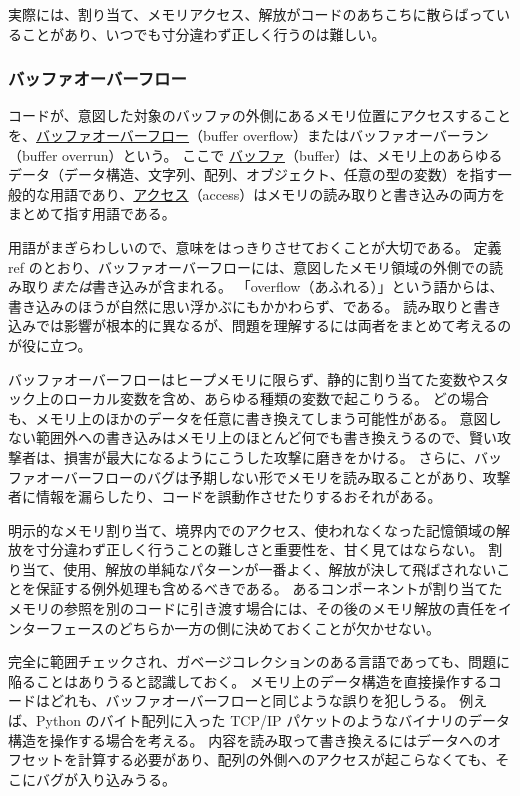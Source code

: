 \documentclass[uplatex]{jsarticle}
\def\ref#1{ref}%
\def\label#1{}%
\begin{document}
実際には、割り当て、メモリアクセス、解放がコードのあちこちに散らばっていることがあり、いつでも寸分違わず正しく行うのは難しい。

\subsubsection{バッファオーバーフロー}\label{subsec:ch9-buffer-overflow}

\begin{dfn}[バッファオーバーフロー]\label{dfn:ch9-buffer-overflow}
コードが、意図した対象のバッファの外側にあるメモリ位置にアクセスすることを、\underline{バッファオーバーフロー}（buffer overflow）またはバッファオーバーラン（buffer overrun）という。
ここで \underline{バッファ}（buffer）は、メモリ上のあらゆるデータ（データ構造、文字列、配列、オブジェクト、任意の型の変数）を指す一般的な用語であり、\underline{アクセス}（access）はメモリの読み取りと書き込みの両方をまとめて指す用語である。
\end{dfn}

用語がまぎらわしいので、意味をはっきりさせておくことが大切である。
定義 \ref{dfn:ch9-buffer-overflow} のとおり、バッファオーバーフローには、意図したメモリ領域の外側での読み取り\emph{または}書き込みが含まれる。
「overflow（あふれる）」という語からは、書き込みのほうが自然に思い浮かぶにもかかわらず、である。
読み取りと書き込みでは影響が根本的に異なるが、問題を理解するには両者をまとめて考えるのが役に立つ。

バッファオーバーフローはヒープメモリに限らず、静的に割り当てた変数やスタック上のローカル変数を含め、あらゆる種類の変数で起こりうる。
どの場合も、メモリ上のほかのデータを任意に書き換えてしまう可能性がある。
意図しない範囲外への書き込みはメモリ上のほとんど何でも書き換えうるので、賢い攻撃者は、損害が最大になるようにこうした攻撃に磨きをかける。
さらに、バッファオーバーフローのバグは予期しない形でメモリを読み取ることがあり、攻撃者に情報を漏らしたり、コードを誤動作させたりするおそれがある。

明示的なメモリ割り当て、境界内でのアクセス、使われなくなった記憶領域の解放を寸分違わず正しく行うことの難しさと重要性を、甘く見てはならない。
割り当て、使用、解放の単純なパターンが一番よく、解放が決して飛ばされないことを保証する例外処理も含めるべきである。
あるコンポーネントが割り当てたメモリの参照を別のコードに引き渡す場合には、その後のメモリ解放の責任をインターフェースのどちらか一方の側に決めておくことが欠かせない。

\begin{rem}[範囲チェックのある言語でも起こりうる]\label{rem:ch9-managed-languages}
完全に範囲チェックされ、ガベージコレクションのある言語であっても、問題に陥ることはありうると認識しておく。
メモリ上のデータ構造を直接操作するコードはどれも、バッファオーバーフローと同じような誤りを犯しうる。
例えば、Python のバイト配列に入った TCP/IP パケットのようなバイナリのデータ構造を操作する場合を考える。
内容を読み取って書き換えるにはデータへのオフセットを計算する必要があり、配列の外側へのアクセスが起こらなくても、そこにバグが入り込みうる。
\end{rem}
\end{document}
